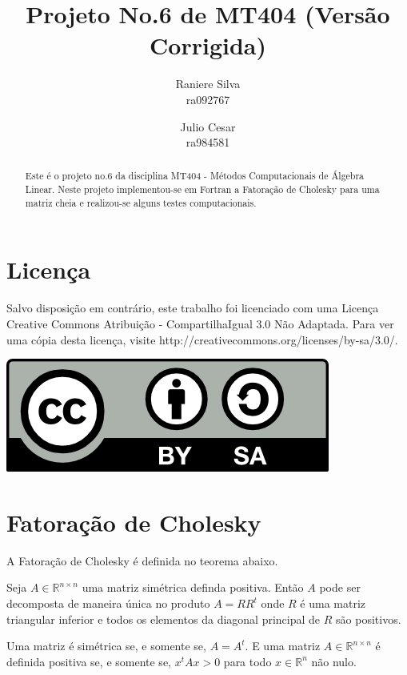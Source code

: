 \documentclass[12pt,a4paper]{article}
\begin{document}
\title{Projeto No.6 de MT404 (Versão Corrigida)}
\author{Raniere Silva \\ ra092767  \and Julio Cesar \\ ra984581}
\maketitle
\begin{abstract}
    Este \'{e} o projeto no.6 da disciplina MT404 - M\'{e}todos Computacionais
    de \'{A}lgebra Linear. Neste projeto implementou-se em Fortran a Fatoração
    de Cholesky para uma matriz cheia e realizou-se alguns testes
    computacionais.
\end{abstract}
\tableofcontents
\lstlistoflistings
\section*{Licen\c{c}a}
Salvo disposi\c{c}\~{a}o em contr\'{a}rio, este trabalho foi licenciado com uma
Licen\c{c}a Creative Commons Atribui\c{c}\~{a}o - CompartilhaIgual 3.0 N\~{a}o
Adaptada. Para ver uma c\'{o}pia desta licen\c{c}a, visite
http://creativecommons.org/licenses/by-sa/3.0/.
\begin{center}
    \includegraphics{../figuras/cc-by-sa.png}
\end{center}
\newpage
\section{Fatora\c{c}\~{a}o de Cholesky}
A Fatoração de Cholesky é definida no teorema abaixo.
\begin{teo}
    Seja $A \in \mathbb{R}^{n \times n}$ uma matriz simétrica definda positiva.
    Então $A$ pode ser decomposta de maneira única no produto $A = R R^t$ onde
    $R$ é uma matriz triangular inferior e todos os elementos da diagonal
    principal de $R$ são positivos.
\end{teo}
Uma matriz é simétrica se, e somente se, $A = A^t$. E uma matriz $A \in
\mathbb{R}^{n \times n}$ é definida positiva se, e somente se, $x^t A x > 0$
para todo $x \in \mathbb{R}^n$ não nulo.
\end{document}
